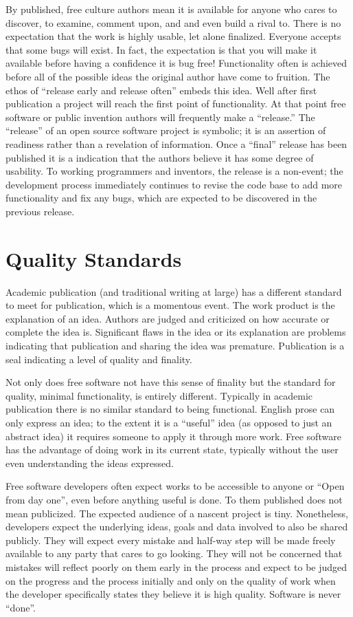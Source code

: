 \documentclass[
	fontsize=10pt, %
	twoside=false, %
	secnumdepth=1, %
]{kaobook}
\begin{document}
By published, free culture
authors mean it is available for anyone who cares to discover, to
examine, comment upon, and and even build a rival to. There is no
expectation that the work is highly usable, let alone
finalized. Everyone accepts that some bugs will exist. In fact, the
expectation is that you will make it available before having a
confidence it is bug free! Functionality often is achieved before all
of the possible ideas the original author have come to fruition. The
ethos of “release early and release often” embeds this idea. Well
after first publication a project will reach the first point of
functionality. At that point free software or public invention authors will frequently
make a “release.” The “release” of an open source software project is
symbolic; it is an assertion of readiness rather than a revelation of
information. Once a “final” release has been published it is a
indication that the authors believe it has some degree of
usability. To working programmers and inventors, the release is a non-event; the
development process immediately continues to revise the code base to
add more functionality and fix any bugs, which are expected to be
discovered in the previous release.

\section{Quality Standards}

Academic publication (and traditional writing at large) has a
different standard to meet for publication, which is a momentous
event. The work product is the explanation of an idea. Authors are
judged and criticized on how accurate or complete the idea
is. Significant flaws in the idea or its explanation are problems
indicating that publication and sharing the idea was
premature. Publication is a seal indicating a level of quality and
finality.

Not only does free software not have this sense of finality
but the standard for quality, minimal functionality, is entirely
different. Typically in academic publication there is no similar
standard to being functional. English prose can only express an idea;
to the extent it is a “useful” idea (as opposed to just an abstract
idea) it requires someone to apply it through more work. Free software
has the advantage of doing work in its current state, typically
without the user even understanding the ideas expressed.

Free software developers often expect works to be accessible to anyone
or “Open from day one”, even before anything useful is done. To them
published does not mean publicized. The expected audience of a nascent
project is tiny. Nonetheless, developers expect the underlying ideas,
goals and data involved to also be shared publicly. They will expect
every mistake and half-way step will be made freely available to any
party that cares to go looking. They will not be concerned that
mistakes will reflect poorly on them early in the process and expect
to be judged on the progress and the process initially and only on the
quality of work when the developer specifically states they believe it
is high quality. Software is never “done”.
\end{document}
